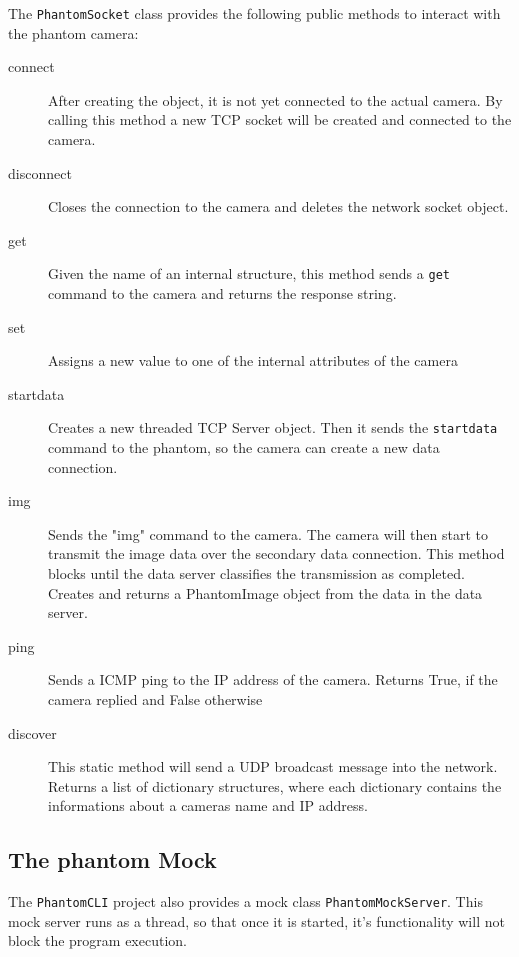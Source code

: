 The \texttt{PhantomSocket} class provides the following public methods to interact with the phantom camera:
\begin{description}
\item[connect] After creating the object, it is not yet connected to the actual camera. By calling this method a new TCP socket will be created and connected to the camera.
\item[disconnect] Closes the connection to the camera and deletes the network socket object.
\item[get] Given the name of an internal structure, this method sends a \texttt{get} command to the camera and returns the response string.
\item[set] Assigns a new value to one of the internal attributes of the camera
\item[startdata] Creates a new threaded TCP Server object. Then it sends the \texttt{startdata} command to the phantom, so the camera can create a new data connection.
\item[img] Sends the "img" command to the camera. The camera will then start to transmit the image data over the secondary data connection. This method blocks until the data server classifies the transmission as completed. Creates and returns a PhantomImage object from the data in the data server.
\item[ping] Sends a ICMP ping to the IP address of the camera. Returns True, if the camera replied and False otherwise
\item[discover] This static method will send a UDP broadcast message into the network. Returns a list of dictionary structures, where each dictionary contains the informations about a cameras name and IP address.
\end{description}

\subsection{The phantom Mock}
The \texttt{PhantomCLI} project also provides a mock class \texttt{PhantomMockServer}. This mock server runs as a thread, so that once it is started, it's functionality will not block the program execution.\par 

